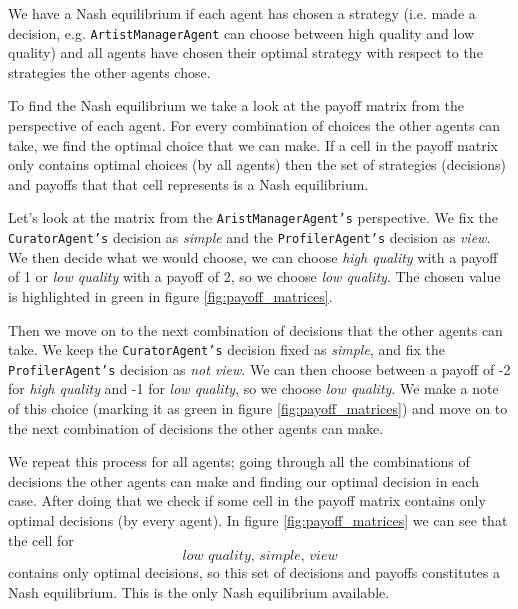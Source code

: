 \documentclass[a4paper, 11pt]{article}
\begin{document}
We have a Nash equilibrium if each agent has chosen a strategy (i.e. made a decision, e.g. \texttt{ArtistManagerAgent} can choose between high quality and low quality) and all agents have chosen their optimal strategy with respect to the strategies the other agents chose.

To find the Nash equilibrium we take a look at the payoff matrix from the perspective of each agent. For every combination of choices the other agents can take, we find the optimal choice that we can make. If a cell in the payoff matrix only contains optimal choices (by all agents) then the set of strategies (decisions) and payoffs that that cell represents is a Nash equilibrium.

Let's look at the matrix from the \texttt{AristManagerAgent's} perspective. We fix the \texttt{CuratorAgent's} decision as \textit{simple} and the \texttt{ProfilerAgent's} decision as \textit{view}. We then decide what we would choose, we can choose \textit{high quality} with a payoff of 1 or \textit{low quality} with a payoff of 2, so we choose \textit{low quality}. The chosen value is highlighted in green in figure \ref{fig:payoff_matrices}.

Then we move on to the next combination of decisions that the other agents can take. We keep the \texttt{CuratorAgent's} decision fixed as \textit{simple}, and fix the \texttt{ProfilerAgent's} decision as \textit{not view}. We can then choose between a payoff of -2 for \textit{high quality} and -1 for \textit{low quality}, so we choose \textit{low quality}. We make a note of this choice (marking it as green in figure \ref{fig:payoff_matrices}) and move on to the next combination of decisions the other agents can make.

We repeat this process for all agents; going through all the combinations of decisions the other agents can make and finding our optimal decision in each case. After doing that we check if some cell in the payoff matrix contains only optimal decisions (by every agent). In figure \ref{fig:payoff_matrices} we can see that the cell for \[\textit{low quality, simple, view}\] contains only optimal decisions, so this set of decisions and payoffs constitutes a Nash equilibrium. This is the only Nash equilibrium available.
\end{document}
